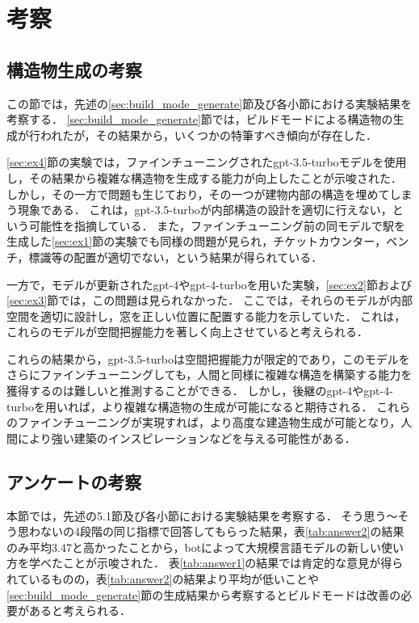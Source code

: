 \chapter{考察}
\thispagestyle{plain}   %

\section{構造物生成の考察}
この節では，先述の\ref{sec:build_mode_generate}節及び各小節における実験結果を考察する．
\ref{sec:build_mode_generate}節では，ビルドモードによる構造物の生成が行われたが，その結果から，いくつかの特筆すべき傾向が存在した．

\ref{sec:ex4}節の実験では，ファインチューニングされたgpt-3.5-turboモデルを使用し，その結果から複雑な構造物を生成する能力が向上したことが示唆された．
しかし，その一方で問題も生じており，その一つが建物内部の構造を埋めてしまう現象である．
これは，gpt-3.5-turboが内部構造の設計を適切に行えない，という可能性を指摘している．
また，ファインチューニング前の同モデルで駅を生成した\ref{sec:ex1}節の実験でも同様の問題が見られ，チケットカウンター，ベンチ，標識等の配置が適切でない，という結果が得られている．

一方で，モデルが更新されたgpt-4やgpt-4-turboを用いた実験，\ref{sec:ex2}節および\ref{sec:ex3}節では，この問題は見られなかった．
ここでは，それらのモデルが内部空間を適切に設計し，窓を正しい位置に配置する能力を示していた．
これは，これらのモデルが空間把握能力を著しく向上させていると考えられる．

これらの結果から，gpt-3.5-turboは空間把握能力が限定的であり，このモデルをさらにファインチューニングしても，人間と同様に複雑な構造を構築する能力を獲得するのは難しいと推測することができる．
しかし，後継のgpt-4やgpt-4-turboを用いれば，より複雑な構造物の生成が可能になると期待される．
これらのファインチューニングが実現すれば，より高度な建造物生成が可能となり，人間により強い建築のインスピレーションなどを与える可能性がある．

\section{アンケートの考察}
本節では，先述の5.1節及び各小節における実験結果を考察する．
そう思う～そう思わないの4段階の同じ指標で回答してもらった結果，表\ref{tab:answer2}の結果のみ平均3.47と高かったことから，botによって大規模言語モデルの新しい使い方を学べたことが示唆された．
表\ref{tab:answer1}の結果では肯定的な意見が得られているものの，表\ref{tab:answer2}の結果より平均が低いことや\ref{sec:build_mode_generate}節の生成結果から考察するとビルドモードは改善の必要があると考えられる．